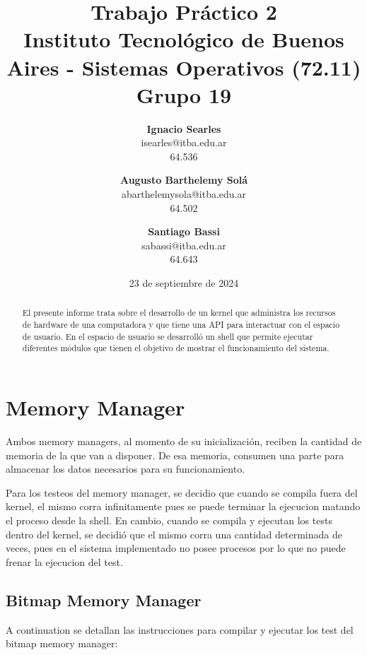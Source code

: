 \documentclass{article}
\title{\textbf{Trabajo Práctico 2} \\ [1ex]
\large Instituto Tecnológico de Buenos Aires - Sistemas Operativos (72.11) \\ [1ex]
\large Grupo 19 }
\date{23 de septiembre de 2024}
\author{
\textbf{Ignacio Searles}\\
isearles@itba.edu.ar\\
64.536
\and
\textbf{Augusto Barthelemy Solá}\\
abarthelemysola@itba.edu.ar\\
64.502
\and
\textbf{Santiago Bassi}\\
sabassi@itba.edu.ar\\
64.643
}
\begin{document}
\maketitle

\begin {abstract}

El presente informe trata sobre el desarrollo de un kernel que administra los recursos de hardware de una computadora y que tiene una API para interactuar con el espacio de usuario. En el espacio de usuario se desarrolló un shell que permite ejecutar diferentes módulos que tienen el objetivo de mostrar el funcionamiento del sistema.

\end {abstract}

\section {Memory Manager}

Ambos memory managers, al momento de su inicialización, reciben la cantidad de memoria de la que van a disponer. De esa memoria, consumen una parte para almacenar los datos necesarios para su funcionamiento.

Para los testeos del memory manager, se decidio que cuando se compila fuera del kernel, el mismo corra infinitamente pues se puede terminar la ejecucion matando el proceso desde la shell. En cambio, cuando se compila y ejecutan los tests dentro del kernel, se decidió que el mismo corra una cantidad determinada de veces, pues en el sistema implementado no posee procesos por lo que no puede frenar la ejecucion del test.

\subsection {Bitmap Memory Manager}

A continuation se detallan las instrucciones para compilar y ejecutar los test del bitmap memory manager:
\end{document}
